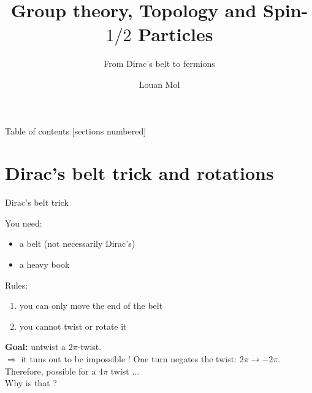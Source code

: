 \documentclass[10pt]{beamer}
\title{Group theory, Topology and Spin-$1/2$ Particles}
\subtitle{From Dirac's belt to fermions}
\date{}
\author{Louan Mol}
\institute{Unversité Libre de Bruxelles\\[2cm]{\small Brussels Summer School of Mathematics 2022}}
\renewcommand{\emph}{\alert}
\begin{document}
\maketitle

\begin{frame}{Table of contents}
    [sections numbered]
    \tableofcontents%
\end{frame}

\section{Dirac's belt trick and rotations}

\begin{frame}{Dirac's belt trick}
    
    You need:
    \begin{itemize}
      \item a belt (not necessarily Dirac's)
      \item a heavy book
    \end{itemize}
    Rules:
    \begin{enumerate}
      \item you can only move the end of the belt
      \item you cannot twist or rotate it
    \end{enumerate}
    \textbf{Goal:} untwist a $2\pi$-twist.\\[0.5cm]
      $\Rightarrow$ it tuns out to be \emph{impossible} ! One turn negates the twist: $2\pi\to-2\pi$. \\[0.5cm]

      Therefore, possible for a $4\pi$ twist ...\\ \hspace{7cm} Why is that ?

\end{frame}
\end{document}
